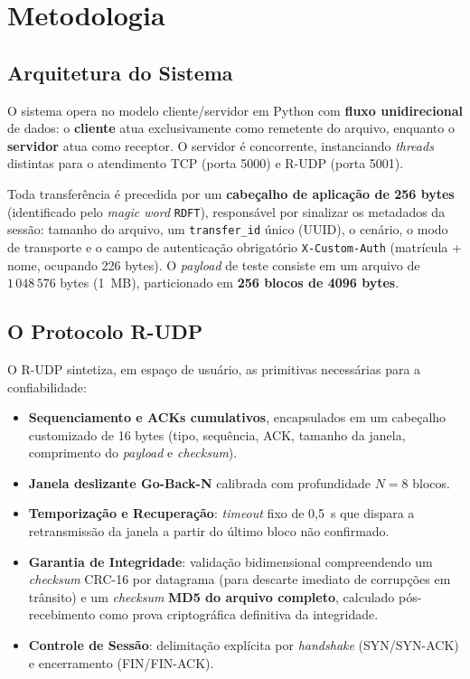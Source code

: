 \documentclass[12pt]{article}
\begin{document}
\section{Metodologia}

\subsection{Arquitetura do Sistema}

O sistema opera no modelo cliente/servidor em Python com \textbf{fluxo unidirecional} de dados: o
\textbf{cliente} atua exclusivamente como remetente do arquivo, enquanto o \textbf{servidor} atua 
como receptor. O servidor é concorrente, instanciando \emph{threads} distintas para o atendimento TCP 
(porta 5000) e R-UDP (porta 5001).

Toda transferência é precedida por um \textbf{cabeçalho de aplicação de 256 bytes} (identificado pelo 
\emph{magic word} \texttt{RDFT}), responsável por sinalizar os metadados da sessão: tamanho do arquivo, 
um \texttt{transfer\_id} único (UUID), o cenário, o modo de transporte e o campo de autenticação obrigatório 
\texttt{X-Custom-Auth} (matrícula + nome, ocupando 226 bytes). O \emph{payload} de teste consiste em um 
arquivo de $1\,048\,576$ bytes (1~MB), particionado em \textbf{256 blocos de 4096 bytes}.

\subsection{O Protocolo R-UDP}

O R-UDP sintetiza, em espaço de usuário, as primitivas necessárias para a confiabilidade:
\begin{itemize}
  \item \textbf{Sequenciamento e ACKs cumulativos}, encapsulados em um cabeçalho customizado de
    16 bytes (tipo, sequência, ACK, tamanho da janela, comprimento do \emph{payload} e \emph{checksum}).
  \item \textbf{Janela deslizante Go-Back-N} calibrada com profundidade $N = 8$ blocos.
  \item \textbf{Temporização e Recuperação}: \emph{timeout} fixo de 0,5~s que dispara a retransmissão 
    da janela a partir do último bloco não confirmado.
  \item \textbf{Garantia de Integridade}: validação bidimensional compreendendo um \emph{checksum} CRC-16 
    por datagrama (para descarte imediato de corrupções em trânsito) e um \emph{checksum} \textbf{MD5 do 
    arquivo completo}, calculado pós-recebimento como prova criptográfica definitiva da integridade.
  \item \textbf{Controle de Sessão}: delimitação explícita por \emph{handshake} (SYN/SYN-ACK) e 
    encerramento (FIN/FIN-ACK).
\end{itemize}
\end{document}
